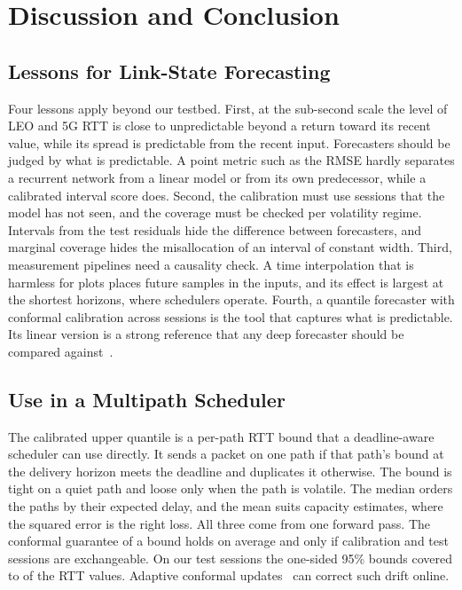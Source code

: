 \section{Discussion and Conclusion}
\label{sec:discussion}
\subsection{Lessons for Link-State Forecasting}
Four lessons apply beyond our testbed. First, at the sub-second scale the level of LEO and 5G RTT is close to unpredictable beyond a return toward its recent value, while its spread is predictable from the recent input. Forecasters should be judged by what is predictable. A point metric such as the RMSE hardly separates a recurrent network from a linear model or from its own predecessor, while a calibrated interval score does. Second, the calibration must use sessions that the model has not seen, and the coverage must be checked per volatility regime. Intervals from the test residuals hide the difference between forecasters, and marginal coverage hides the misallocation of an interval of constant width. Third, measurement pipelines need a causality check. A time interpolation that is harmless for plots places future samples in the inputs, and its effect is largest at the shortest horizons, where schedulers operate. Fourth, a quantile forecaster with conformal calibration across sessions is the tool that captures what is predictable. Its linear version is a strong reference that any deep forecaster should be compared against~\cite{zeng2023transformers}.

\subsection{Use in a Multipath Scheduler}
The calibrated upper quantile is a per-path RTT bound that a deadline-aware scheduler can use directly. It sends a packet on one path if that path's bound at the delivery horizon meets the deadline and duplicates it otherwise. The bound is tight on a quiet path and loose only when the path is volatile. The median orders the paths by their expected delay, and the mean suits capacity estimates, where the squared error is the right loss. All three come from one forward pass. The conformal guarantee of a bound holds on average and only if calibration and test sessions are exchangeable. On our test sessions the one-sided 95\% bounds covered \BoundCovLo{} to \BoundCovHi{} of the RTT values. Adaptive conformal updates~\cite{gibbs2021adaptive} can correct such drift online.

